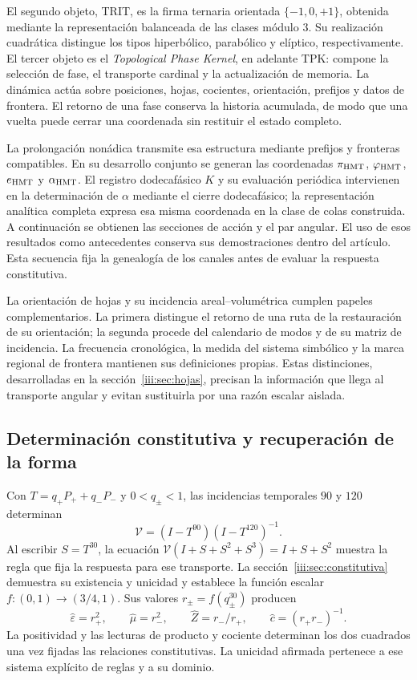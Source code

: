 El segundo objeto, TRIT, es la firma ternaria orientada
$\{-1,0,+1\}$, obtenida mediante la representación balanceada de las
clases módulo $3$. Su realización cuadrática distingue los tipos
hiperbólico, parabólico y elíptico, respectivamente. El tercer objeto
es el \emph{Topological Phase Kernel}, en adelante TPK: compone la
selección de fase, el transporte cardinal y la actualización de memoria.
La dinámica actúa sobre posiciones, hojas, cocientes, orientación,
prefijos y datos de frontera. El retorno de una fase conserva la
historia acumulada, de modo que una vuelta puede cerrar una coordenada
sin restituir el estado completo.

La prolongación nonádica transmite esa estructura mediante prefijos y
fronteras compatibles. En su desarrollo conjunto se generan las
coordenadas $\pi_{\rm HMT}$, $\varphi_{\rm HMT}$,
$e_{\rm HMT}$ y $\alpha_{\rm HMT}$. El registro dodecafásico $K$
y su evaluación periódica intervienen en la determinación de
$\alpha$ mediante el cierre dodecafásico; la representación analítica completa expresa esa misma
coordenada en la clase de colas construida. A continuación se obtienen
las secciones de acción y el par angular. El uso de esos resultados
como antecedentes conserva sus demostraciones dentro del artículo.
Esta secuencia fija la genealogía de los canales antes de evaluar la
respuesta constitutiva.

La orientación de hojas y su incidencia areal--volumétrica cumplen
papeles complementarios. La primera distingue el retorno de una ruta
de la restauración de su orientación; la segunda procede del calendario
de modos y de su matriz de incidencia. La frecuencia cronológica, la
medida del sistema simbólico y la marca regional de frontera mantienen
sus definiciones propias. Estas distinciones, desarrolladas en la
sección~\ref{iii:sec:hojas}, precisan la información que llega al
transporte angular y evitan sustituirla por una razón escalar aislada.

\clearpage
\subsection{Determinación constitutiva y recuperación de la forma}

Con $T=q_+P_++q_-P_-$ y $0<q_\pm<1$, las incidencias temporales
$90$ y $120$ determinan
\[
\mathcal V=(I-T^{90})(I-T^{120})^{-1}.
\]
Al escribir $S=T^{30}$, la ecuación
$\mathcal V(I+S+S^2+S^3)=I+S+S^2$ muestra la regla que fija la
respuesta para ese transporte. La sección~\ref{iii:sec:constitutiva}
demuestra su existencia y unicidad y establece la función escalar
$f:(0,1)\to(3/4,1)$. Sus valores $r_\pm=f(q_\pm^{30})$
producen
\[
\widehat\varepsilon=r_+^2,\qquad
\widehat\mu=r_-^2,\qquad
\widehat Z=r_-/r_+,\qquad
\widehat c=(r_+r_-)^{-1}.
\]
La positividad y las lecturas de producto y cociente determinan los dos
cuadrados una vez fijadas las relaciones constitutivas. La unicidad
afirmada pertenece a ese sistema explícito de reglas y a su dominio.

